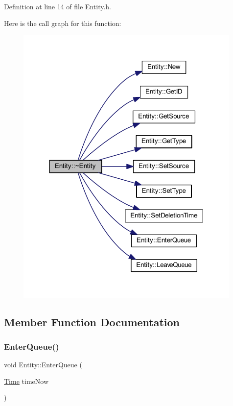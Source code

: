 Definition at line 14 of file Entity.\+h.

Here is the call graph for this function\+:\nopagebreak
\begin{figure}[H]
\begin{center}
\leavevmode
\includegraphics[width=315pt]{class_entity_adf6d3f7cb1b2ba029b6b048a395cc8ae_cgraph}
\end{center}
\end{figure}


\subsection{Member Function Documentation}
\mbox{\label{class_entity_a957592ba81c76d59f622a887fee36e8d}} 
\subsubsection{\texorpdfstring{Enter\+Queue()}{EnterQueue()}}
{\footnotesize\ttfamily void Entity\+::\+Enter\+Queue (\begin{DoxyParamCaption}\item[{\hyperlink{_simulation_executive_8h_ac2d3e0ba793497bcca555c7c2cf64ff3}{Time}}]{time\+Now }\end{DoxyParamCaption})}



